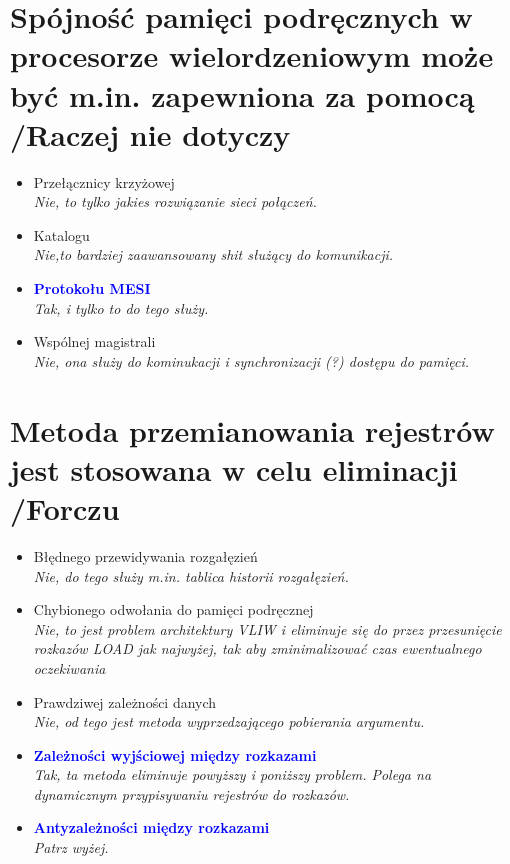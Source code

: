 \section{Spójność pamięci podręcznych w procesorze wielordzeniowym może być m.in. zapewniona za pomocą {\small /Raczej nie dotyczy}}
	\begin{itemize}
    \item Przełącznicy krzyżowej\\
    {\small \emph{Nie, to tylko jakies rozwiązanie sieci połączeń.}}
    \item Katalogu\\
    {\small \emph{Nie,to bardziej zaawansowany shit służący do komunikacji.}}
    \item \textcolor{Blue}{\textbf{Protokołu MESI}}\\
    {\small \emph{Tak, i tylko to do tego służy.}}
    \item Wspólnej magistrali\\
    {\small \emph{Nie, ona służy do kominukacji i synchronizacji (?) dostępu do pamięci.}}
    \end{itemize}

\section{Metoda przemianowania rejestrów jest stosowana w celu eliminacji {\small /Forczu}}
	\begin{itemize}
    \item Błędnego przewidywania rozgałęzień\\
    {\small \emph{Nie, do tego służy m.in. tablica historii rozgałęzień.}}
    \item Chybionego odwołania do pamięci podręcznej\\
    {\small \emph{Nie, to jest problem architektury VLIW i eliminuje się do przez przesunięcie rozkazów LOAD jak najwyżej, tak aby zminimalizować czas ewentualnego oczekiwania}}
    \item Prawdziwej zależności danych\\
    {\small \emph{Nie, od tego jest metoda wyprzedzającego pobierania argumentu.}}
    \item \textcolor{Blue}{\textbf{Zależności wyjściowej między rozkazami}}\\
    {\small \emph{Tak, ta metoda eliminuje powyższy i poniższy problem. Polega na dynamicznym przypisywaniu rejestrów do rozkazów.}}
    \item \textcolor{Blue}{\textbf{Antyzależności między rozkazami}}\\
    {\small \emph{Patrz wyżej.}}
    
    \end{itemize}

